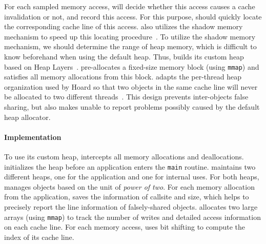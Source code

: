 For each sampled memory access, \cheetah{} will decide whether this access causes a cache invalidation or not, and record this access. For this purpose, \cheetah{} should quickly locate the corresponding cache line of this access. \Cheetah{} also utilizes the shadow memory mechanism to speed up this locating procedure~\cite{qinzhao, Predator}. 
To utilize the shadow memory mechanism, we should determine the range of heap memory, which is difficult to know beforehand when using the default heap. Thus, \cheetah{} builds its custom heap based on Heap Layers~\cite{Berger:2001:CHM:378795.378821}. \cheetah{} pre-allocates a fixed-size memory block (using \texttt{mmap}) and satisfies all memory allocations from this block. \cheetah{} adapts the per-thread heap organization used by Hoard so that two objects in the same cache line will never be allocated to two different threads~\cite{Hoard}. This design prevents inter-objects false sharing, but also makes \cheetah{}  unable to report problems possibly caused by the default heap allocator.  

\paragraph{Implementation} 
To use its custom heap, \cheetah{} intercepts all memory allocations and deallocations. \cheetah{} initializes the heap before an application enters the \texttt{main} routine. \cheetah{} maintains two different heaps, one for the application and one for internal uses. For both heaps, \cheetah{} manages objects based on the unit of {\it power of two}. For each memory allocation from the application, \cheetah{} saves the information of callsite and size, which helps \cheetah{} to precisely report the line information of falsely-shared objects.  
\Cheetah{} allocates two large arrays (using \texttt{mmap}) to track the number of writes and detailed access information on each cache line. For each memory access, \cheetah{} uses bit shifting to compute the index of its cache line. 


